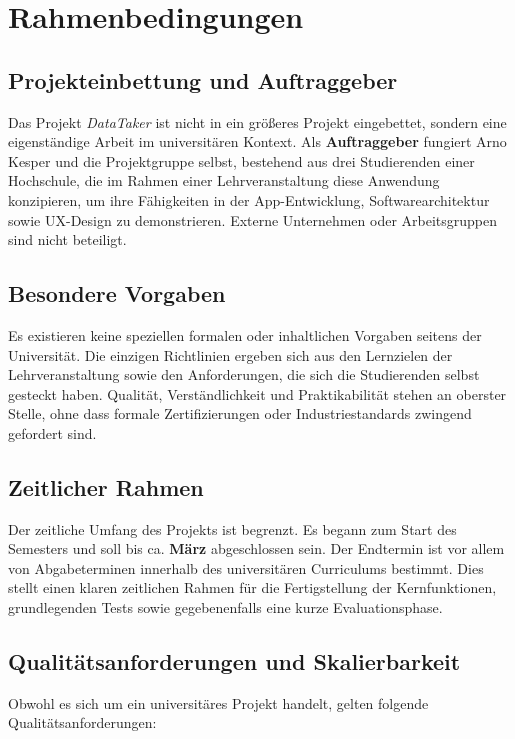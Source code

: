 \documentclass[a4paper,12pt]{article}
\begin{document}
\section{Rahmenbedingungen}
\subsection{Projekteinbettung und Auftraggeber}
Das Projekt \emph{DataTaker} ist nicht in ein größeres Projekt eingebettet, sondern eine eigenständige Arbeit im universitären Kontext. Als \textbf{Auftraggeber} fungiert Arno Kesper und die Projektgruppe selbst, bestehend aus drei Studierenden einer Hochschule, die im Rahmen einer Lehrveranstaltung diese Anwendung konzipieren, um ihre Fähigkeiten in der App-Entwicklung, Softwarearchitektur sowie UX-Design zu demonstrieren. Externe Unternehmen oder Arbeitsgruppen sind nicht beteiligt.

\subsection{Besondere Vorgaben}
Es existieren keine speziellen formalen oder inhaltlichen Vorgaben seitens der Universität. Die einzigen Richtlinien ergeben sich aus den Lernzielen der Lehrveranstaltung sowie den Anforderungen, die sich die Studierenden selbst gesteckt haben. Qualität, Verständlichkeit und Praktikabilität stehen an oberster Stelle, ohne dass formale Zertifizierungen oder Industriestandards zwingend gefordert sind.

\subsection{Zeitlicher Rahmen}
Der zeitliche Umfang des Projekts ist begrenzt. Es begann zum Start des Semesters und soll bis ca. \textbf{März} abgeschlossen sein. Der Endtermin ist vor allem von Abgabeterminen innerhalb des universitären Curriculums bestimmt. Dies stellt einen klaren zeitlichen Rahmen für die Fertigstellung der Kernfunktionen, grundlegenden Tests sowie gegebenenfalls eine kurze Evaluationsphase.

\subsection{Qualitätsanforderungen und Skalierbarkeit}
Obwohl es sich um ein universitäres Projekt handelt, gelten folgende Qualitätsanforderungen:
\end{document}
